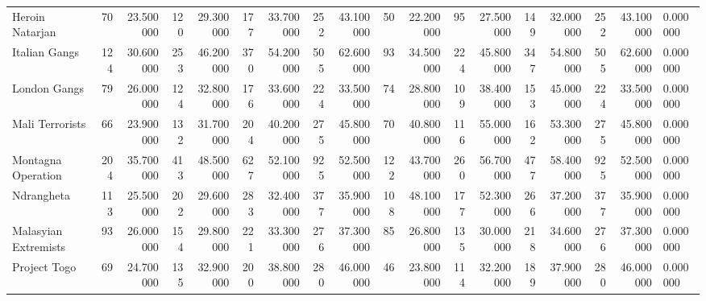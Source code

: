 \begin{tabular}{lrrrrrrrrrrrrrrrrl}
Heroin Natarjan & 70 & 23.500000 & 120 & 29.300000 & 177 & 33.700000 & 252 & 43.100000 & 50 & 22.200000 & 95 & 27.500000 & 149 & 32.000000 & 252 & 43.100000 & 0.000000 \\
Italian Gangs & 124 & 30.600000 & 253 & 46.200000 & 370 & 54.200000 & 505 & 62.600000 & 93 & 34.500000 & 224 & 45.800000 & 347 & 54.800000 & 505 & 62.600000 & 0.000000 \\
London Gangs & 79 & 26.000000 & 124 & 32.800000 & 176 & 33.600000 & 224 & 33.500000 & 74 & 28.800000 & 109 & 38.400000 & 153 & 45.000000 & 224 & 33.500000 & 0.000000 \\
Mali Terrorists & 66 & 23.900000 & 132 & 31.700000 & 204 & 40.200000 & 275 & 45.800000 & 70 & 40.800000 & 116 & 55.000000 & 162 & 53.300000 & 275 & 45.800000 & 0.000000 \\
Montagna Operation & 204 & 35.700000 & 413 & 48.500000 & 627 & 52.100000 & 925 & 52.500000 & 122 & 43.700000 & 260 & 56.700000 & 477 & 58.400000 & 925 & 52.500000 & 0.000000 \\
Ndrangheta & 113 & 25.500000 & 202 & 29.600000 & 283 & 32.400000 & 377 & 35.900000 & 108 & 48.100000 & 177 & 52.300000 & 266 & 37.200000 & 377 & 35.900000 & 0.000000 \\
Malasyian Extremists & 93 & 26.000000 & 154 & 29.800000 & 221 & 33.300000 & 276 & 37.300000 & 85 & 26.800000 & 135 & 30.000000 & 218 & 34.600000 & 276 & 37.300000 & 0.000000 \\
Project Togo & 69 & 24.700000 & 135 & 32.900000 & 200 & 38.800000 & 280 & 46.000000 & 46 & 23.800000 & 114 & 32.200000 & 189 & 37.900000 & 280 & 46.000000 & 0.000000 \\
\end{tabular}
